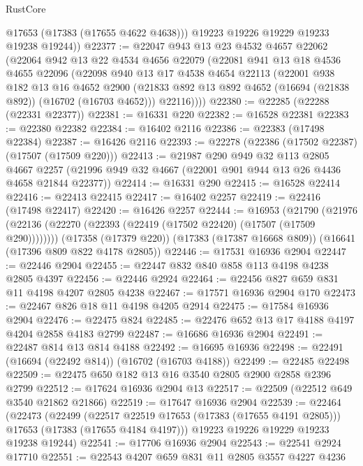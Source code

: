 \begin{lexlean}{RustCore}
\begin{coremodule}
          @17653
          (@17383 (@17655 @4622 @4638)))
        @19223
        @19226
        @19229
        @19233
        @19238
        @19244))
@22377 := @22047
    @943
    @13
    @23
    @4532
    @4657
    @22062
    (@22064
      @942
      @13
      @22
      @4534
      @4656
      @22079
      (@22081
        @941
        @13
        @18
        @4536
        @4655
        @22096
        (@22098
          @940
          @13
          @17
          @4538
          @4654
          @22113
          (@22001
            @938
            @182
            @13
            @16
            @4652
            @2900
            (@21833 @892 @13 @892 @4652 (@16694 (@21838 @892)) (@16702 (@16703 @4652)))
            @22116))))
@22380 := @22285 (@22288 (@22331 @22377))
@22381 := @16331 @220
@22382 := @16528 @22381
@22383 := @22380 @22382
@22384 := @16402 @2116
@22386 := @22383 (@17498 @22384)
@22387 := @16426 @2116
@22393 := @22278 (@22386 (@17502 @22387) (@17507 (@17509 @220)))
@22413 := @21987
    @290
    @949
    @32
    @113
    @2805
    @4667
    @2257
    (@21996 @949 @32 @4667 (@22001 @901 @944 @13 @26 @4436 @4658 @21844 @22377))
@22414 := @16331 @290
@22415 := @16528 @22414
@22416 := @22413 @22415
@22417 := @16402 @2257
@22419 := @22416 (@17498 @22417)
@22420 := @16426 @2257
@22444 := @16953
    (@21790 (@21976 (@22136 (@22270 (@22393 (@22419 (@17502 @22420) (@17507 (@17509 @290))))))))
    (@17358 (@17379 @220))
    (@17383 (@17387 @16668 @809))
    (@16641 (@17396 @809 @822 @4178 @2805))
@22446 := @17531 @16936 @2904
@22447 := @22446 @2904
@22455 := @22447 @832 @840 @858 @113 @4198 @4238 @2805 @4397
@22456 := @22446 @2924
@22464 := @22456 @827 @659 @831 @11 @4198 @4207 @2805 @4238
@22467 := @17571 @16936 @2904 @170
@22473 := @22467 @826 @18 @11 @4198 @4205 @2914
@22475 := @17584 @16936 @2904
@22476 := @22475 @824
@22485 := @22476 @652 @13 @17 @4188 @4197 @4204 @2858 @4183 @2799
@22487 := @16686 @16936 @2904
@22491 := @22487 @814 @13 @814 @4188
@22492 := @16695 @16936
@22498 := @22491 (@16694 (@22492 @814)) (@16702 (@16703 @4188))
@22499 := @22485 @22498
@22509 := @22475 @650 @182 @13 @16 @3540 @2805 @2900 @2858 @2396 @2799
@22512 := @17624 @16936 @2904 @13
@22517 := @22509 (@22512 @649 @3540 @21862 @21866)
@22519 := @17647 @16936 @2904
@22539 := @22464
    (@22473
      (@22499
        (@22517 @22519 @17653 (@17383 (@17655 @4191 @2805)))
        @17653
        (@17383 (@17655 @4184 @4197)))
      @19223
      @19226
      @19229
      @19233
      @19238
      @19244)
@22541 := @17706 @16936 @2904
@22543 := @22541 @2924 @17710
@22551 := @22543 @4207 @659 @831 @11 @2805 @3557 @4227 @4236

\end{coremodule}
\end{lexlean}
